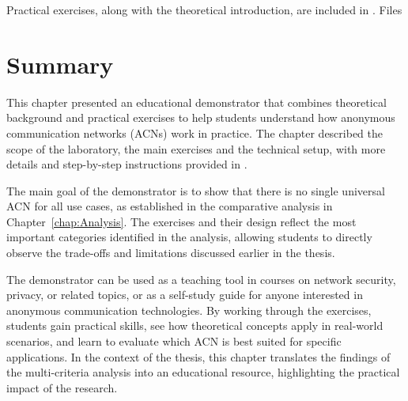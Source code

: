 Practical exercises, along with the theoretical introduction, are included in . Files

\section{Summary}

This chapter presented an educational demonstrator that combines theoretical background and practical exercises to help students understand how anonymous communication networks (ACNs) work in practice. The chapter described the scope of the laboratory, the main exercises and the technical setup, with more details and step-by-step instructions provided in .

The main goal of the demonstrator is to show that there is no single universal ACN for all use cases, as established in the comparative analysis in Chapter~\ref{chap:Analysis}. The exercises and their design reflect the most important categories identified in the analysis, allowing students to directly observe the trade-offs and limitations discussed earlier in the thesis. 

The demonstrator can be used as a teaching tool in courses on network security, privacy, or related topics, or as a self-study guide for anyone interested in anonymous communication technologies. By working through the exercises, students gain practical skills, see how theoretical concepts apply in real-world scenarios, and learn to evaluate which ACN is best suited for specific applications. In the context of the thesis, this chapter translates the findings of the multi-criteria analysis into an educational resource, highlighting the practical impact of the research.
